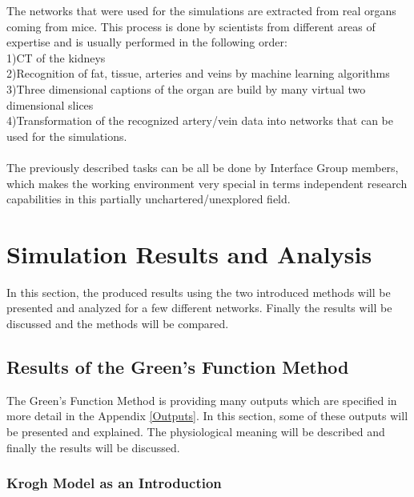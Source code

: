 The networks that were used for the simulations are extracted from real organs coming from mice. This process is done by scientists from different areas of expertise and is usually performed in the following order:
\\1)CT of the kidneys
\\2)Recognition of fat, tissue, arteries and veins by machine learning algorithms
\\3)Three dimensional captions of the organ are build by many virtual two dimensional slices
\\4)Transformation of the recognized artery/vein data into networks that can be used for the simulations.\\
\\The previously described tasks can be all be done by Interface Group members, which makes the working environment very special in terms independent research capabilities in this partially unchartered/unexplored field. %

\newpage
\section{Simulation Results and Analysis}
In this section, the produced results using the two introduced methods will be presented and analyzed for a few different networks. Finally the results will be discussed and the methods will be compared.

\subsection{Results of the Green's Function Method}

The Green's Function Method is providing many outputs which are specified in more detail in the Appendix \ref{Outputs}. In this section, some of these outputs will be presented and explained. The physiological meaning will be described and finally the results will be discussed.

\subsubsection*{Krogh Model as an Introduction}
\label{Krogh}

